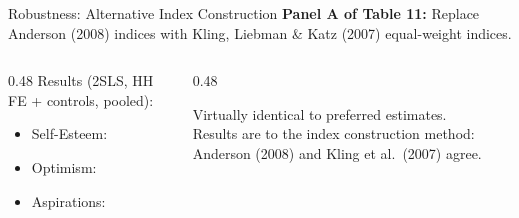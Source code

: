 \documentclass[aspectratio=169, 10pt]{beamer}
\begin{document}
\begin{frame}{Robustness: Alternative Index Construction}
  \textbf{Panel A of Table 11:} Replace Anderson (2008) indices with Kling, Liebman \& Katz (2007) equal-weight indices.

  \vspace{0.8em}
  \begin{columns}[c]
    \begin{column}{0.48\textwidth}
      Results (2SLS, HH FE + controls, pooled):
      \begin{itemize}
        \item Self-Esteem: 
        \item Optimism: 
        \item Aspirations: 
      \end{itemize}
    \end{column}
    \begin{column}{0.48\textwidth}
      \begin{keybox}
        Virtually identical to preferred estimates.\\[0.5em]
        Results are  to the index construction method: Anderson (2008) and Kling et al.\ (2007) agree.
      \end{keybox}
    \end{column}
  \end{columns}
\end{frame}
\end{document}
